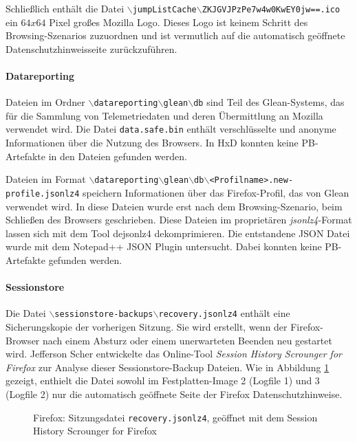 \begin{appendices}
Schließlich enthält die Datei \texttt{$\backslash$jumpListCache$\backslash$ZKJGVJPzPe7w4w0KwEY0jw==.ico} ein $64x64$ Pixel großes Mozilla Logo. Dieses Logo ist keinem Schritt des Browsing-Szenarios zuzuordnen und ist vermutlich auf die automatisch geöffnete Datenschutzhinweisseite zurückzuführen.

\paragraph*{Datareporting}
Dateien im Ordner \texttt{$\backslash$datareporting$\backslash$glean$\backslash$db} sind Teil des Glean-Systems, das für die Sammlung von Telemetriedaten und deren Übermittlung an Mozilla verwendet wird. \cite{GitHub.05.06.2023}
Die Datei \texttt{data.safe.bin} enthält verschlüsselte und anonyme Informationen über die Nutzung des Browsers. In HxD konnten keine PB-Artefakte in den Dateien gefunden werden. 

Dateien im Format \texttt{$\backslash$datareporting$\backslash$glean$\backslash$db$\backslash$<Profilname>.new-profile.jsonlz4} speichern Informationen über das Firefox-Profil, das von Glean verwendet wird. In diese Dateien wurde erst nach dem Browsing-Szenario, beim Schließen des Browsers geschrieben. Diese Dateien im proprietären \textit{jsonlz4}-Format lassen sich mit dem Tool dejsonlz4 dekomprimieren. Die entstandene JSON Datei wurde mit dem Notepad++ JSON Plugin untersucht. Dabei konnten keine PB-Artefakte gefunden werden.

\paragraph*{Sessionstore}
Die Datei \texttt{$\backslash$sessionstore-backups$\backslash$recovery.jsonlz4} enthält eine Sicherungskopie der vorherigen Sitzung. Sie wird erstellt, wenn der Firefox-Browser nach einem Absturz oder einem unerwarteten Beenden neu gestartet wird. 
Jefferson Scher entwickelte das Online-Tool \textit{Session History Scrounger for Firefox} zur Analyse dieser \glqq{}Sessionstore-Backup\grqq{} Dateien. \cite{JeffersonScher.29.11.2020}
Wie in Abbildung \ref{img:firefox-session-history-scrounger} gezeigt, enthielt die Datei sowohl im Festplatten-Image 2 (Logfile 1) und 3 (Logfile 2) nur die automatisch geöffnete Seite der Firefox Datenschutzhinweise.
\begin{figure}[h!]
	\caption{Firefox: Sitzungsdatei \texttt{recovery.jsonlz4}, geöffnet mit dem \glqq{}Session History Scrounger for Firefox\grqq{}}
	\label{img:firefox-session-history-scrounger}
\end{figure}


\end{appendices}
